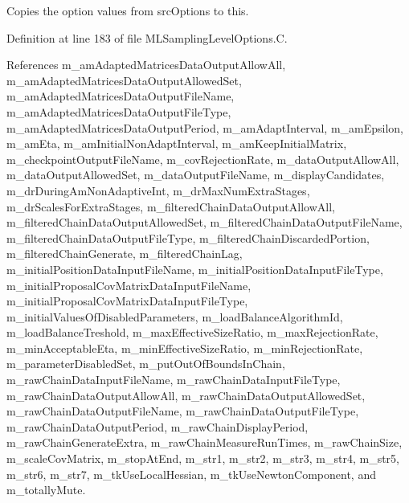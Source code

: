 Copies the option values from {\ttfamily src\-Options} to {\ttfamily this}. 



Definition at line 183 of file M\-L\-Sampling\-Level\-Options.\-C.



References m\-\_\-am\-Adapted\-Matrices\-Data\-Output\-Allow\-All, m\-\_\-am\-Adapted\-Matrices\-Data\-Output\-Allowed\-Set, m\-\_\-am\-Adapted\-Matrices\-Data\-Output\-File\-Name, m\-\_\-am\-Adapted\-Matrices\-Data\-Output\-File\-Type, m\-\_\-am\-Adapted\-Matrices\-Data\-Output\-Period, m\-\_\-am\-Adapt\-Interval, m\-\_\-am\-Epsilon, m\-\_\-am\-Eta, m\-\_\-am\-Initial\-Non\-Adapt\-Interval, m\-\_\-am\-Keep\-Initial\-Matrix, m\-\_\-checkpoint\-Output\-File\-Name, m\-\_\-cov\-Rejection\-Rate, m\-\_\-data\-Output\-Allow\-All, m\-\_\-data\-Output\-Allowed\-Set, m\-\_\-data\-Output\-File\-Name, m\-\_\-display\-Candidates, m\-\_\-dr\-During\-Am\-Non\-Adaptive\-Int, m\-\_\-dr\-Max\-Num\-Extra\-Stages, m\-\_\-dr\-Scales\-For\-Extra\-Stages, m\-\_\-filtered\-Chain\-Data\-Output\-Allow\-All, m\-\_\-filtered\-Chain\-Data\-Output\-Allowed\-Set, m\-\_\-filtered\-Chain\-Data\-Output\-File\-Name, m\-\_\-filtered\-Chain\-Data\-Output\-File\-Type, m\-\_\-filtered\-Chain\-Discarded\-Portion, m\-\_\-filtered\-Chain\-Generate, m\-\_\-filtered\-Chain\-Lag, m\-\_\-initial\-Position\-Data\-Input\-File\-Name, m\-\_\-initial\-Position\-Data\-Input\-File\-Type, m\-\_\-initial\-Proposal\-Cov\-Matrix\-Data\-Input\-File\-Name, m\-\_\-initial\-Proposal\-Cov\-Matrix\-Data\-Input\-File\-Type, m\-\_\-initial\-Values\-Of\-Disabled\-Parameters, m\-\_\-load\-Balance\-Algorithm\-Id, m\-\_\-load\-Balance\-Treshold, m\-\_\-max\-Effective\-Size\-Ratio, m\-\_\-max\-Rejection\-Rate, m\-\_\-min\-Acceptable\-Eta, m\-\_\-min\-Effective\-Size\-Ratio, m\-\_\-min\-Rejection\-Rate, m\-\_\-parameter\-Disabled\-Set, m\-\_\-put\-Out\-Of\-Bounds\-In\-Chain, m\-\_\-raw\-Chain\-Data\-Input\-File\-Name, m\-\_\-raw\-Chain\-Data\-Input\-File\-Type, m\-\_\-raw\-Chain\-Data\-Output\-Allow\-All, m\-\_\-raw\-Chain\-Data\-Output\-Allowed\-Set, m\-\_\-raw\-Chain\-Data\-Output\-File\-Name, m\-\_\-raw\-Chain\-Data\-Output\-File\-Type, m\-\_\-raw\-Chain\-Data\-Output\-Period, m\-\_\-raw\-Chain\-Display\-Period, m\-\_\-raw\-Chain\-Generate\-Extra, m\-\_\-raw\-Chain\-Measure\-Run\-Times, m\-\_\-raw\-Chain\-Size, m\-\_\-scale\-Cov\-Matrix, m\-\_\-stop\-At\-End, m\-\_\-str1, m\-\_\-str2, m\-\_\-str3, m\-\_\-str4, m\-\_\-str5, m\-\_\-str6, m\-\_\-str7, m\-\_\-tk\-Use\-Local\-Hessian, m\-\_\-tk\-Use\-Newton\-Component, and m\-\_\-totally\-Mute.



